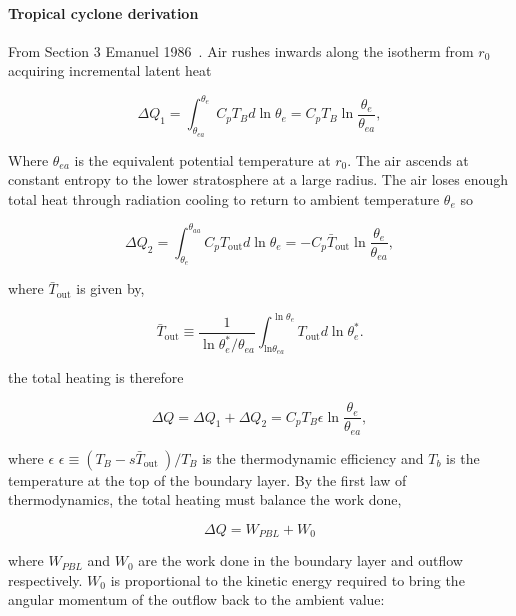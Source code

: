 \paragraph{Tropical cyclone derivation}

From Section 3 Emanuel 1986~\cite{emanuel1986air}.
Air rushes inwards along the isotherm from $r_{0}$ acquiring
incremental latent heat

\begin{equation}
\Delta Q_{1}=\int_{\theta_{e a}}^{\theta_{e}} C_{p} T_{B} d \ln \theta_{e}=C_{p} T_{B} \ln \frac{\theta_{e}}{\theta_{e a}},
\end{equation}

Where $\theta_{e a}$ is the equivalent potential temperature at
$r_{0}$. The air ascends at constant entropy to the lower stratosphere
at a large radius. The air loses enough total heat through radiation cooling
to return to ambient temperature $\theta_{e}$ so

\begin{equation}
\Delta Q_{2}=\int_{\theta_{e}}^{\theta_{a a}} C_{p} T_{\mathrm{out}} d \ln \theta_{e}=-C_{p} \bar{T}_{\mathrm{out}} \ln \frac{\theta_{e}}{\theta_{e a}},
\end{equation}

where $\bar{T}_{\mathrm{out}}$ is given by,

\begin{equation}
\bar{T}_{\mathrm{out}} \equiv \frac{1}{\ln \theta_{e}^{*} / \theta_{e a}} \int_{\mathrm{ln} \theta_{e a}}^{\ln \theta_{e}} T_{\mathrm{out}} d \ln \theta_{e}^{*}.
\end{equation}

the total heating is therefore

\begin{equation}
\Delta Q=\Delta Q_{1}+\Delta Q_{2}=C_{p} T_{B} \epsilon \ln \frac{\theta_{e}}{\theta_{e a}},
\end{equation}

where $\epsilon$
$
\epsilon \equiv\left(T_{B}-s\bar{T}_{\text {out }}\right) / T_{B}
$
is the thermodynamic efficiency and $T_b$ is the temperature at the top of the
boundary layer. By the first law of thermodynamics, the total heating
must balance the work done,

\begin{equation}
\Delta Q=W_{P B L}+W_{0}
\end{equation}

where $W_{PBL}$ and $W_0$ are the work done in the boundary layer and outflow
respectively. $W_0$ is proportional to the kinetic energy required to
bring the angular momentum of the outflow back to the ambient value:

